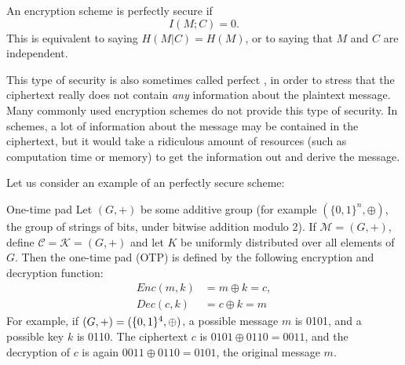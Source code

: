 \begin{definition}
An encryption scheme is perfectly secure if
\[
I(M;C) = 0.
\]
This is equivalent to saying $H(M|C) = H(M)$, or to saying that $M$ and $C$ are independent.
\end{definition}
This type of security is also sometimes called perfect , in order to stress that the ciphertext really does not contain \emph{any} information about the plaintext message. Many commonly used encryption schemes do not provide this type of security. In  schemes, a lot of information about the message may be contained in the ciphertext, but it would take a ridiculous amount of resources (such as computation time or memory) to get the information out and derive the message.

Let us consider an example of an perfectly secure scheme:
\begin{example}{One-time pad}
Let $(G,+)$ be some additive group (for example $(\{0,1\}^n, \oplus)$, the group of strings of bits, under bitwise addition modulo 2). If $\mathcal{M} = (G,+)$, define $\mathcal{C} = \mathcal{K} = (G,+)$ and let $K$ be uniformly distributed over all elements of $G$. Then the one-time pad (OTP) is defined by the following encryption and decryption function:
\begin{align*}
Enc(m,k) &= m \oplus k = c,\\
Dec(c,k) &= c \oplus k = m
\end{align*}
For example, if $(G,+) = (\{0,1\}^4,\oplus)$, a possible message $m$ is 0101, and a possible key $k$ is 0110. The ciphertext $c$ is $0101 \oplus 0110 = 0011$, and the decryption of $c$ is again $0011 \oplus 0110 = 0101$, the original message $m$.
\end{example}
